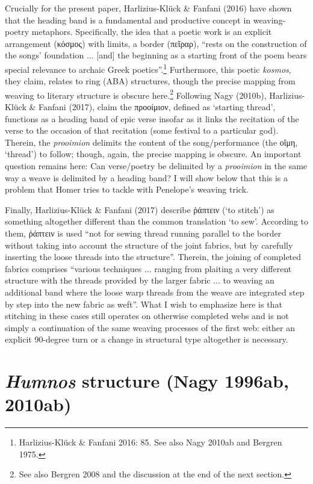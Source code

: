 \documentclass[12pt]{article}
\begin{document}
Crucially for the present paper, Harlizius-Kl\"{u}ck \& Fanfani (2016) have shown that the heading band is a fundamental and productive concept in weaving-poetry metaphors. Specifically, the idea that a poetic work is an explicit arrangement (κόσμος) with limits, a border (πεῖραρ), ``rests on the construction of the songs' foundation ... [and] the beginning as a starting front of the poem bears special relevance to archaic Greek poetics''.\footnote{ Harlizius-Kl\"{u}ck \& Fanfani 2016: 85. See also Nagy 2010ab and Bergren 1975.} Furthermore, this poetic \textit{kosmos}, they claim, relates to ring (ABA) structures, though the precise mapping from weaving to literary structure is obscure here.\footnote{ See also Bergren 2008 and the discussion at the end of the next section.} Following Nagy (2010b), Harlizius-Kl\"{u}ck \& Fanfani (2017), claim the προοίμιον, defined as `starting thread', functions as a heading band of epic verse insofar as it links the recitation of the verse to the occasion of that recitation (some festival to a particular god). Therein, the \textit{prooimion} delimits the content of the song/performance (the οἴμη,  `thread') to follow; though, again, the precise mapping is obscure. An important question remains here: Can verse/poetry be delimited by a \textit{prooimion} in the same way a weave is delimited by a heading band? I will show below that this is a problem that Homer tries to tackle with Penelope's weaving trick.

Finally, Harlizius-Kl\"{u}ck \& Fanfani (2017) describe ῥάπτειν (`to stitch') as something altogether different than the common translation `to sew'. According to them, ῥάπτειν is used ``not for sewing thread running parallel to the border without taking into account the structure of the joint fabrics, but by carefully inserting the loose threads into the structure''. Therein, the joining of completed fabrics comprises ``various techniques ... ranging from plaiting a very different structure with the threads provided by the larger fabric ... to weaving an additional band where the loose warp threads from the weave are integrated step by step into the new fabric as weft''. What I wish to emphasize here is that stitching in these cases still operates on otherwise completed webs and is not simply a continuation of the same weaving processes of the first web: either an explicit 90-degree turn or a change in structural type altogether is necessary.

\section{\textit{Humnos} structure (Nagy 1996ab, 2010ab)}
\end{document}
